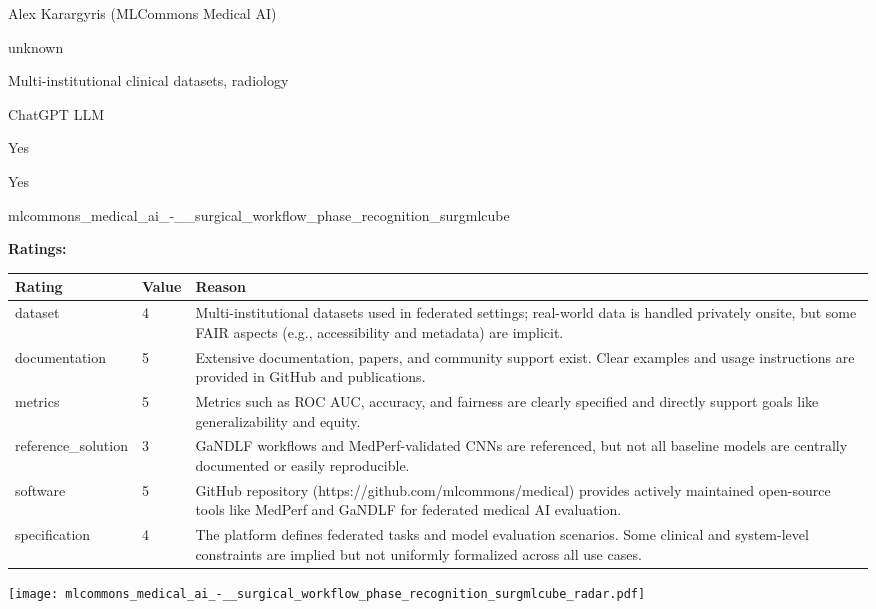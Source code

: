{{\begin{description}[labelwidth=4cm, labelsep=1em, leftmargin=4cm, itemsep=0.1em, parsep=0em]
  \item[contact.name:] Alex Karargyris (MLCommons Medical AI)
  \item[contact.email:] unknown
  \item[datasets.links.name:] Multi-institutional clinical datasets, radiology
  \item[results.links.name:] ChatGPT LLM
  \item[fair.reproducible:] Yes
  \item[fair.benchmark\_ready:] Yes
  \item[id:] mlcommons\_medical\_ai\_-\_\_surgical\_workflow\_phase\_recognition\_surgmlcube
  \item[Citations:] \cite{karargyris2023federated}
\end{description}

{\bf Ratings:} ~ \\

\begin{tabular}{p{} p{} p{}}
\hline
Rating & Value & Reason \\
\hline
dataset & 4 & Multi-institutional datasets used in federated settings; real-world data is handled
privately onsite, but some FAIR aspects (e.g., accessibility and metadata) are implicit.
 \\
documentation & 5 & Extensive documentation, papers, and community support exist. Clear examples and usage
instructions are provided in GitHub and publications.
 \\
metrics & 5 & Metrics such as ROC AUC, accuracy, and fairness are clearly specified and directly
support goals like generalizability and equity.
 \\
reference\_solution & 3 & GaNDLF workflows and MedPerf-validated CNNs are referenced, but not all baseline models
are centrally documented or easily reproducible.
 \\
software & 5 & GitHub repository (https://github.com/mlcommons/medical) provides actively maintained
open-source tools like MedPerf and GaNDLF for federated medical AI evaluation.
 \\
specification & 4 & The platform defines federated tasks and model evaluation scenarios. Some clinical and
system-level constraints are implied but not uniformly formalized across all use cases.
 \\
\hline
\end{tabular}

\texttt{[image: mlcommons\_medical\_ai\_-\_\_surgical\_workflow\_phase\_recognition\_surgmlcube\_radar.pdf]}
}}
\clearpage
